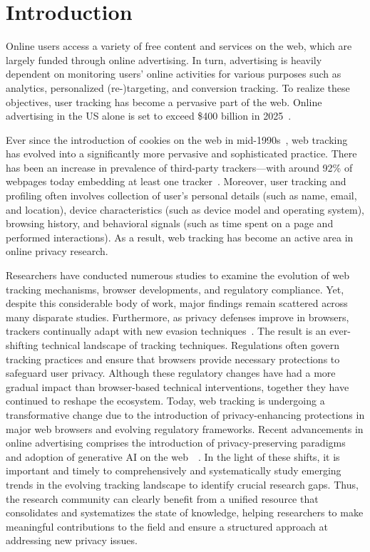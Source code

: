 \section{Introduction}
\label{sec:introduction}
\vspace{-3mm}

Online users access a variety of free content and services on the web, which are largely funded through online advertising.
%
In turn, advertising is heavily dependent on monitoring users' online activities for various purposes 
%
such as analytics, personalized (re-)targeting, and conversion tracking.
%
To realize these objectives, user tracking has become a pervasive part of the web.
%
Online advertising in the US alone is set to exceed \$400 billion in 2025~\cite{adSpendEmarketer2025}.

Ever since the introduction of cookies on the web in mid-1990s~\cite{cookieIntroduction}, web tracking has evolved into a significantly more pervasive  and sophisticated practice.
%
There has been an increase in prevalence of third-party trackers---with around 92\% of webpages today embedding at least one tracker~\cite{urban2024WebAlmanac2024}.
%
Moreover, user tracking and profiling often involves collection of user's personal details (such as name, email, and location), device characteristics (such as device model and operating system), browsing history, and behavioral signals (such as time spent on a page and performed interactions).
%
As a result, web tracking has become an active area in online privacy research.


Researchers have conducted numerous studies to examine the evolution of web tracking mechanisms, browser developments, and regulatory compliance. 
%
Yet, despite this considerable body of work, major findings remain scattered across many disparate studies.
Furthermore, as privacy defenses improve in browsers, trackers continually adapt with new evasion techniques~\cite{narayanan2018web}.
%
The result is an ever-shifting technical landscape of tracking techniques.
%
Regulations often govern tracking practices and ensure that browsers provide necessary protections to safeguard user privacy.
%
Although these regulatory changes have had a more gradual impact than browser-based technical interventions, together they have continued to reshape the ecosystem. 
%
Today, web tracking is undergoing a transformative change due to the introduction of privacy-enhancing  protections in major web browsers and evolving regulatory frameworks.
%
Recent advancements in online advertising comprises the introduction of privacy-preserving paradigms~\cite{privacySandbox} and adoption of generative AI on the web~\cite{perplexity2025, operator2025, builtin-ai}~\cite{chavezNewPathPrivacy2024}.
%
In the light of these shifts, it is important and timely to comprehensively and systematically study emerging trends in the evolving tracking landscape to identify crucial research gaps.
%
Thus, the research community can clearly benefit from a unified resource that consolidates and systematizes the state of knowledge, helping researchers to make meaningful contributions to the field and ensure a structured approach at addressing new privacy issues.

